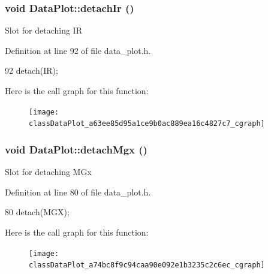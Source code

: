 \hypertarget{classDataPlot_a63ee85d95a1ce9b0ac889ea16c4827c7}{
\subsubsection[{detachIr}]{\setlength{\rightskip}{0pt plus 5cm}void DataPlot::detachIr ()}}
\label{classDataPlot_a63ee85d95a1ce9b0ac889ea16c4827c7}
Slot for detaching IR 

Definition at line 92 of file data\_\-plot.h.




\begin{DoxyCode}
92 { detach(IR); }
\end{DoxyCode}




Here is the call graph for this function:\nopagebreak
\begin{figure}[H]
\begin{center}
\leavevmode
\texttt{[image: classDataPlot\_a63ee85d95a1ce9b0ac889ea16c4827c7\_cgraph]}
\end{center}
\end{figure}


\hypertarget{classDataPlot_a74bc8f9c94caa90e092e1b3235c2c6ec}{
\subsubsection[{detachMgx}]{\setlength{\rightskip}{0pt plus 5cm}void DataPlot::detachMgx ()}}
\label{classDataPlot_a74bc8f9c94caa90e092e1b3235c2c6ec}
Slot for detaching MGx 

Definition at line 80 of file data\_\-plot.h.




\begin{DoxyCode}
80 { detach(MGX); }
\end{DoxyCode}




Here is the call graph for this function:\nopagebreak
\begin{figure}[H]
\begin{center}
\leavevmode
\texttt{[image: classDataPlot\_a74bc8f9c94caa90e092e1b3235c2c6ec\_cgraph]}
\end{center}
\end{figure}


